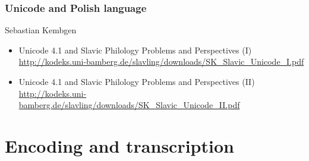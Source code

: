 \documentclass[pdfpagemode=UseNone]{beamer}
\begin{document}
\begin{frame}
  \frametitle{Unicode and Polish language}
    \begin{block}{Sebastian Kembgen}
      \begin{itemize}
      \item Unicode 4.1 and Slavic Philology
  Problems and Perspectives (I)
      \url{http://kodeks.uni-bamberg.de/slavling/downloads/SK_Slavic_Unicode_I.pdf}
    \item  Unicode 4.1 and Slavic Philology
  Problems and Perspectives (II)
       \url{http://kodeks.uni-bamberg.de/slavling/downloads/SK_Slavic_Unicode_II.pdf}
      \end{itemize}
    \end{block}

\end{frame}



\section{Encoding and transcription}
\end{document}
